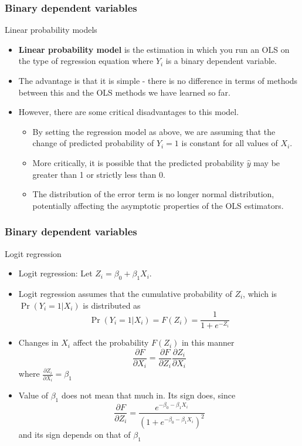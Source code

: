 \documentclass[compress]{beamer}
\begin{document}
\begin{frame}
\frametitle{Binary dependent variables}
Linear probability models
\begin{itemize}
\item \textbf{Linear probability model} is the estimation in which you run an OLS on the type of regression equation where $Y_i$ is a binary dependent variable.
\item The advantage is that it is simple - there is no difference in terms of methods between this and the OLS methods we have learned so far. 
\item However, there are some critical disadvantages to this model. 
\begin{itemize}
\item By setting the regression model as above, we are assuming that the change of predicted probability of $Y_i=1$ is constant for all values of $X_i$. 
\item More critically, it is possible that the predicted probability $\hat{y}$ may be greater than 1 or strictly less than 0.
\item The distribution of the error term is no longer normal distribution, potentially affecting the asymptotic properties of the OLS estimators.
\end{itemize}
\end{itemize}
\end{frame}

\begin{frame}
\frametitle{Binary dependent variables}
Logit regression
\begin{itemize}
\item Logit regression: Let $Z_i=\beta_0+\beta_1X_i$. 
\item Logit regression assumes that the cumulative probability of $Z_i$, which is $\Pr(Y_i=1|X_i)$  is distributed as
\[
\Pr(Y_i=1|X_i)=F(Z_i)=\frac{1}{1+e^{-Z_i}}
\]
\item Changes in $X_i$ affect the probability $F(Z_i)$ in this manner
\[
\frac{\partial F}{\partial X_i} = \frac{\partial F}{\partial Z_i}\frac{\partial Z_i}{\partial X_i}  
\]
where $\frac{\partial Z_i}{\partial X_i}  =\beta_1$
\item  Value of $\beta_1$ does not mean that much in. Its sign does, since
\[
 \frac{\partial F}{\partial Z_i}=\frac{e^{-\beta_0 -\beta_1X_i}}{(1+e^{-\beta_0 -\beta_1X_i})^2}
\]
and its sign depends on that of $\beta_1$
\end{itemize}
\end{frame}
\end{document}

